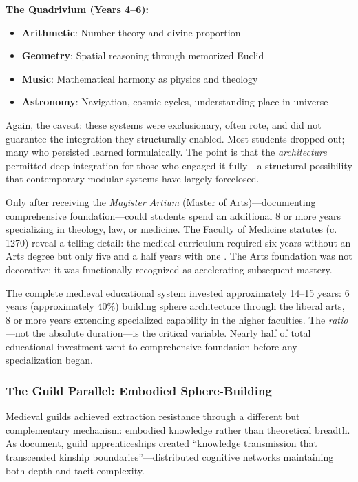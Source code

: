 \textbf{The Quadrivium (Years 4--6):}
\begin{itemize}
    \item \textbf{Arithmetic}: Number theory and divine proportion
    \item \textbf{Geometry}: Spatial reasoning through memorized Euclid
    \item \textbf{Music}: Mathematical harmony as physics and theology
    \item \textbf{Astronomy}: Navigation, cosmic cycles, understanding place in universe
\end{itemize}

Again, the caveat: these systems were exclusionary, often rote, and did not guarantee the integration they structurally enabled. Most students dropped out; many who persisted learned formulaically. The point is that the \textit{architecture} permitted deep integration for those who engaged it fully---a structural possibility that contemporary modular systems have largely foreclosed.

Only after receiving the \textit{Magister Artium} (Master of Arts)---documenting comprehensive foundation---could students spend an additional 8 or more years specializing in theology, law, or medicine. The Faculty of Medicine statutes (c. 1270) reveal a telling detail: the medical curriculum required six years without an Arts degree but only five and a half years with one \citep[Vol.~I, No.~434, pp.~516--518]{denifle1889}. The Arts foundation was not decorative; it was functionally recognized as accelerating subsequent mastery.

The complete medieval educational system invested approximately 14--15 years: 6 years (approximately 40\%) building sphere architecture through the liberal arts, 8 or more years extending specialized capability in the higher faculties. The \textit{ratio}---not the absolute duration---is the critical variable. Nearly half of total educational investment went to comprehensive foundation before any specialization began.

\subsubsection{The Guild Parallel: Embodied Sphere-Building}

Medieval guilds achieved extraction resistance through a different but complementary mechanism: embodied knowledge rather than theoretical breadth. As \citet{delacroix2018} document, guild apprenticeships created ``knowledge transmission that transcended kinship boundaries''---distributed cognitive networks maintaining both depth and tacit complexity.

